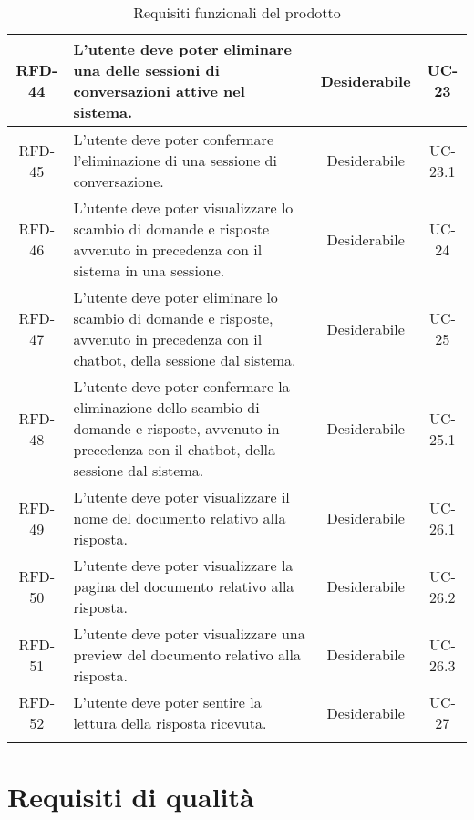 \begin{xltabular}{\textwidth}{| c | X | c | c |}
    \hline
    RFD-44 & L’utente deve poter eliminare una delle sessioni di conversazioni attive nel sistema. & Desiderabile & UC-23 \\
    \hline
    RFD-45 & L’utente deve poter confermare l’eliminazione di una sessione di conversazione. & Desiderabile & UC-23.1 \\
    \hline
    RFD-46 & L’utente deve poter visualizzare lo scambio di domande e risposte avvenuto in precedenza con il sistema in una sessione. & Desiderabile & UC-24 \\
    \hline
    RFD-47 & L’utente deve poter eliminare lo scambio di domande e risposte, avvenuto in precedenza con il chatbot, della sessione dal sistema. & Desiderabile & UC-25 \\
    \hline
    RFD-48 & L’utente deve poter confermare la eliminazione dello scambio di domande e risposte, avvenuto in precedenza con il chatbot, della sessione dal sistema. & Desiderabile & UC-25.1 \\
    \hline
    RFD-49 & L’utente deve poter visualizzare il nome del documento relativo alla risposta. & Desiderabile & UC-26.1 \\
    \hline
    RFD-50 & L'utente deve poter visualizzare la pagina del documento relativo alla risposta. & Desiderabile & UC-26.2 \\
    \hline
    RFD-51 & L’utente deve poter visualizzare una preview del documento relativo alla risposta. & Desiderabile & UC-26.3 \\
    \hline
    RFD-52 & L’utente deve poter sentire la lettura della risposta ricevuta. & Desiderabile & UC-27 \\
    \hline
     \caption{Requisiti funzionali del prodotto}
    \label{tab:reqfun}
\end{xltabular}
\endgroup

\section{Requisiti di qualità}

